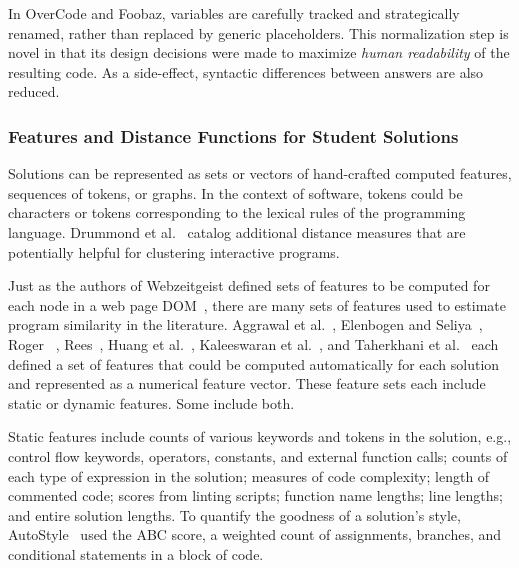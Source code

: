 In OverCode and Foobaz, variables are carefully tracked and strategically renamed, rather than replaced by generic placeholders. This normalization step is novel in that its design decisions were made to maximize {\it human readability} of the resulting code. As a side-effect, syntactic differences between answers are also reduced.

\subsubsection{Features and Distance Functions for Student Solutions}



Solutions can be represented as sets or vectors of hand-crafted computed features, sequences of tokens, or graphs. In the context of software, tokens could be characters or tokens corresponding to the lexical rules of the programming language. Drummond et al.~\cite{drummond2014learning} catalog additional distance measures that are potentially helpful for clustering interactive programs.


Just as the authors of Webzeitgeist defined sets of features to be computed for each node in a web page DOM~\cite{webzeitgeist}, there are many sets of features used to estimate program similarity in the literature. Aggrawal et al.~\cite{srikant2014system}, Elenbogen and Seliya~\cite{Elenbogen}, Roger ~\cite{ACESthesis}, Rees~\cite{Rees:1982}, Huang et al.~\cite{MOOCshop}, Kaleeswaran et al.~\cite{kaleeswaran2016semi}, and Taherkhani et al.~\cite{taherkhani2010recognizing} each defined a set of features that could be computed automatically for each solution and represented as a numerical feature vector. These feature sets each include static or dynamic features. Some include both.

Static features include counts of various keywords and tokens in the solution, e.g., control flow keywords, operators, constants, and external function calls; counts of each type of expression in the solution;  measures of code complexity; length of commented code; scores from linting scripts; function name lengths; line lengths; and entire solution lengths. To quantify the goodness of a solution's style, AutoStyle~\cite{choudhury2016autostyle} used the ABC score, a weighted count of assignments, branches, and conditional statements in a block of code.

